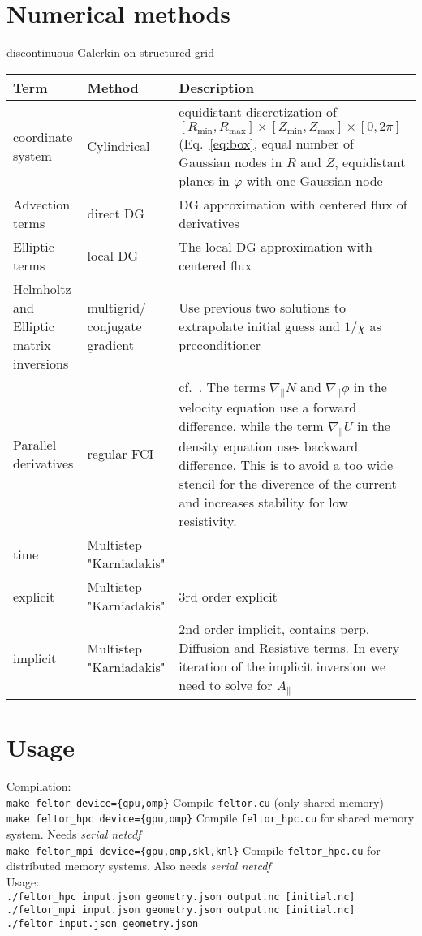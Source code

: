 \section{Numerical methods}
discontinuous Galerkin on structured grid
\begin{longtable}{p{3cm}l>{\RaggedRight}p{8cm}}
\toprule
\rowcolor{gray!50}\textbf{Term} &  \textbf{Method} & \textbf{Description}  \\ \midrule
    coordinate system & Cylindrical & equidistant discretization of $[R_{\min},R_{\max}] \times [Z_{\min},Z_{\max}] \times [0,2\pi]$ (Eq.~\eqref{eq:box}, equal number of Gaussian nodes in $R$ and $Z$, equidistant planes in $\varphi$ with one Gaussian node \\
Advection terms & direct DG & DG approximation with centered flux of derivatives \\
Elliptic terms & local DG & The local DG approximation with centered flux \\
Helmholtz and Elliptic matrix inversions & multigrid/ conjugate gradient & Use previous two solutions to extrapolate initial guess and $1/\chi$ as preconditioner \\
Parallel derivatives & regular  FCI & cf.~\cite{Held2016,Stegmeir2017}. The terms $\nabla_\parallel N$ and $\nabla_\parallel \phi$ in the velocity equation use a forward difference, while the term $\nabla_\parallel U$ in the
density equation uses backward difference. This is to avoid a too wide stencil for the diverence of the current and increases stability for low resistivity. \\
time & Multistep "Karniadakis" & \\
\qquad explicit & Multistep "Karniadakis" & $3$rd order explicit\\
\qquad implicit & Multistep "Karniadakis" & $2$nd order implicit, contains perp. Diffusion and Resistive terms. In every iteration of the implicit inversion we need to solve for $A_\parallel$\\
\bottomrule
\end{longtable}

\section{Usage}

Compilation:\\
\texttt{make feltor device=\{gpu,omp\}} Compile \texttt{feltor.cu} (only shared memory)\\
\texttt{make feltor\_hpc device=\{gpu,omp\}} Compile \texttt{feltor\_hpc.cu} for shared memory system. Needs {\it serial netcdf} \\
\texttt{make feltor\_mpi device=\{gpu,omp,skl,knl\}} Compile \texttt{feltor\_hpc.cu} for distributed memory systems. Also needs {\it serial netcdf}\\
Usage:\\
\texttt{./feltor\_hpc input.json geometry.json output.nc [initial.nc]} \\
\texttt{./feltor\_mpi input.json geometry.json output.nc [initial.nc]} \\
\texttt{./feltor input.json geometry.json } \\

